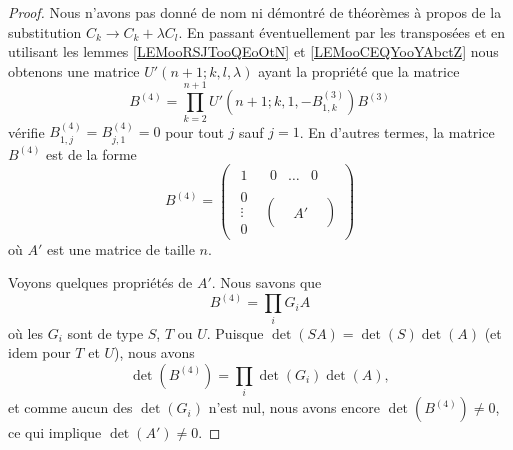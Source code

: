 \begin{proof}
	Nous n'avons pas donné de nom ni démontré de théorèmes à propos de la substitution \( C_k\to C_k+\lambda C_l\). En passant éventuellement par les transposées et en utilisant les lemmes \ref{LEMooRSJTooQEoOtN} et \ref{LEMooCEQYooYAbctZ} nous obtenons une matrice \( U'(n+1;k,l,\lambda)\) ayant la propriété que la matrice
	\begin{equation}
		B^{(4)}=\prod_{k=2}^{n+1} U'(n+1;k,1,-B^{(3)}_{1,k})B^{(3)}
	\end{equation}
	vérifie \( B^{(4)}_{1,j}=B^{(4)}_{j,1}=0\) pour tout \( j\) sauf \( j=1\). En d'autres termes, la matrice \( B^{(4)}\) est de la forme
	\begin{equation}
		B^{(4)}=\begin{pmatrix}
		\begin{matrix} 1 \end{matrix}   & \begin{matrix}
				0 & \ldots & 0
			\end{matrix}                          \\
		\begin{matrix}
			0       \\
			\vdots  \\
			0
		\end{matrix}                    & \begin{pmatrix}
			 &    & \\
			 & A' & \\
			 &    &
			\end{pmatrix}
		\end{pmatrix}
	\end{equation}
	où \( A'\) est une matrice de taille \( n\).

	Voyons quelques propriétés de \( A'\). Nous savons que
	\begin{equation}
		B^{(4)}=\prod_i G_iA
	\end{equation}
	où les \( G_i\) sont de type \( S\), \( T\) ou \( U\). Puisque \( \det(SA)=\det(S)\det(A)\) (et idem pour \( T\) et \( U\)), nous avons
	\begin{equation}
		\det(B^{(4)})=\prod_i\det(G_i)\det(A),
	\end{equation}
	et comme aucun des \( \det(G_i)\) n'est nul, nous avons encore \( \det(B^{(4)})\neq 0\), ce qui implique \( \det(A')\neq 0\).


\end{proof}
